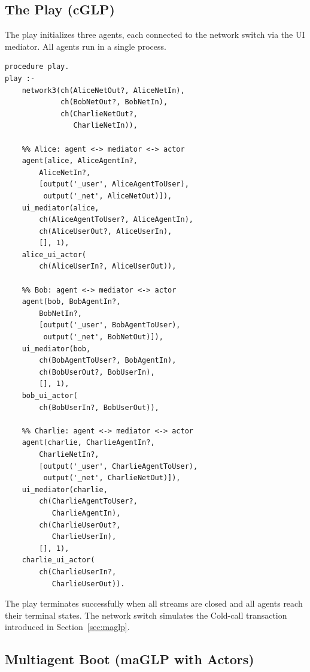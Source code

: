 \subsection{The Play (cGLP)}
\label{app:play}

The play initializes three agents, each connected to the network switch via the UI mediator. All agents run in a single process.

\begin{verbatim}
procedure play.
play :-
    network3(ch(AliceNetOut?, AliceNetIn),
             ch(BobNetOut?, BobNetIn),
             ch(CharlieNetOut?,
                CharlieNetIn)),

    %% Alice: agent <-> mediator <-> actor
    agent(alice, AliceAgentIn?,
        AliceNetIn?,
        [output('_user', AliceAgentToUser),
         output('_net', AliceNetOut)]),
    ui_mediator(alice,
        ch(AliceAgentToUser?, AliceAgentIn),
        ch(AliceUserOut?, AliceUserIn),
        [], 1),
    alice_ui_actor(
        ch(AliceUserIn?, AliceUserOut)),

    %% Bob: agent <-> mediator <-> actor
    agent(bob, BobAgentIn?,
        BobNetIn?,
        [output('_user', BobAgentToUser),
         output('_net', BobNetOut)]),
    ui_mediator(bob,
        ch(BobAgentToUser?, BobAgentIn),
        ch(BobUserOut?, BobUserIn),
        [], 1),
    bob_ui_actor(
        ch(BobUserIn?, BobUserOut)),

    %% Charlie: agent <-> mediator <-> actor
    agent(charlie, CharlieAgentIn?,
        CharlieNetIn?,
        [output('_user', CharlieAgentToUser),
         output('_net', CharlieNetOut)]),
    ui_mediator(charlie,
        ch(CharlieAgentToUser?,
           CharlieAgentIn),
        ch(CharlieUserOut?,
           CharlieUserIn),
        [], 1),
    charlie_ui_actor(
        ch(CharlieUserIn?,
           CharlieUserOut)).
\end{verbatim}

The play terminates successfully when all streams are closed and all agents reach their terminal states. The network switch simulates the Cold-call transaction introduced in Section~\ref{sec:maglp}.

\subsection{Multiagent Boot (maGLP with Actors)}
\label{app:maglp-boot}

